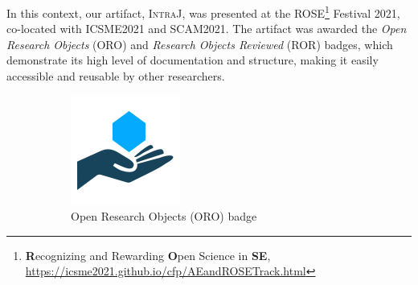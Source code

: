 In this context, our artifact, \textsc{IntraJ}, was presented at the
ROSE\footnote{\textbf{R}ecognizing and Rewarding \textbf{O}pen Science in \textbf{SE},
\url{https://icsme2021.github.io/cfp/AEandROSETrack.html}} Festival 2021,
co-located with ICSME2021 and SCAM2021. The artifact was awarded the \emph{Open Research Objects}
(ORO) and \emph{Research Objects Reviewed} (ROR) badges, which demonstrate its high level of documentation
and structure, making it easily accessible and reusable by other researchers.
\begin{figure}[htbp]
  \centering
  \begin{subfigure}{0.3\linewidth}
    \includegraphics[width=\linewidth]{kappa/img/Open_research.png}
    \caption{Open Research Objects (ORO) badge}
    \label{fig:ORO}
  \end{subfigure}\hspace{2cm}
  \begin{subfigure}{0.3\linewidth}

\end{subfigure}
\end{figure}
